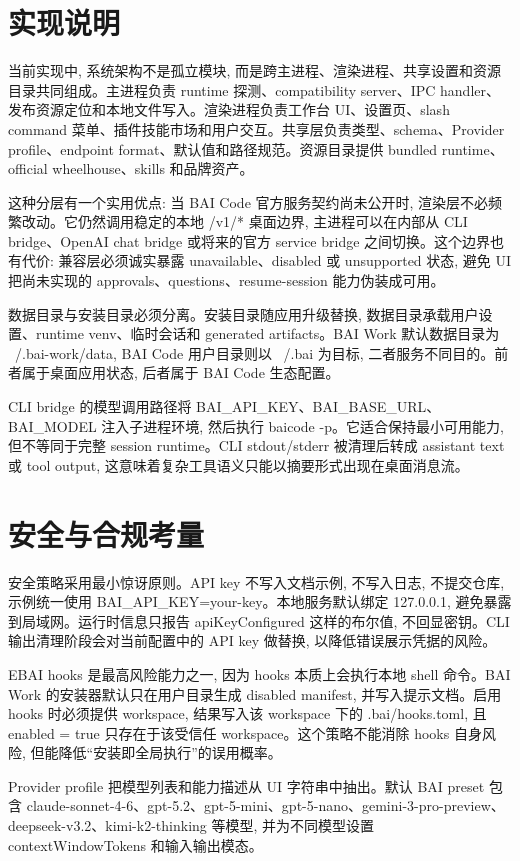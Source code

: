 \section{实现说明}
当前实现中, 系统架构不是孤立模块, 而是跨主进程、渲染进程、共享设置和资源目录共同组成。主进程负责 runtime 探测、compatibility server、IPC handler、发布资源定位和本地文件写入。渲染进程负责工作台 UI、设置页、slash command 菜单、插件技能市场和用户交互。共享层负责类型、schema、Provider profile、endpoint format、默认值和路径规范。资源目录提供 bundled runtime、official wheelhouse、skills 和品牌资产。

这种分层有一个实用优点: 当 BAI Code 官方服务契约尚未公开时, 渲染层不必频繁改动。它仍然调用稳定的本地 /v1/* 桌面边界, 主进程可以在内部从 CLI bridge、OpenAI chat bridge 或将来的官方 service bridge 之间切换。这个边界也有代价: 兼容层必须诚实暴露 unavailable、disabled 或 unsupported 状态, 避免 UI 把尚未实现的 approvals、questions、resume-session 能力伪装成可用。

数据目录与安装目录必须分离。安装目录随应用升级替换, 数据目录承载用户设置、runtime venv、临时会话和 generated artifacts。BAI Work 默认数据目录为 ~/.bai-work/data, BAI Code 用户目录则以 ~/.bai 为目标, 二者服务不同目的。前者属于桌面应用状态, 后者属于 BAI Code 生态配置。

CLI bridge 的模型调用路径将 BAI\_API\_KEY、BAI\_BASE\_URL、BAI\_MODEL 注入子进程环境, 然后执行 baicode -p。它适合保持最小可用能力, 但不等同于完整 session runtime。CLI stdout/stderr 被清理后转成 assistant text 或 tool output, 这意味着复杂工具语义只能以摘要形式出现在桌面消息流。

\section{安全与合规考量}
安全策略采用最小惊讶原则。API key 不写入文档示例, 不写入日志, 不提交仓库, 示例统一使用 BAI\_API\_KEY=your-key。本地服务默认绑定 127.0.0.1, 避免暴露到局域网。运行时信息只报告 apiKeyConfigured 这样的布尔值, 不回显密钥。CLI 输出清理阶段会对当前配置中的 API key 做替换, 以降低错误展示凭据的风险。

EBAI hooks 是最高风险能力之一, 因为 hooks 本质上会执行本地 shell 命令。BAI Work 的安装器默认只在用户目录生成 disabled manifest, 并写入提示文档。启用 hooks 时必须提供 workspace, 结果写入该 workspace 下的 .bai/hooks.toml, 且 enabled = true 只存在于该受信任 workspace。这个策略不能消除 hooks 自身风险, 但能降低“安装即全局执行”的误用概率。

Provider profile 把模型列表和能力描述从 UI 字符串中抽出。默认 BAI preset 包含 claude-sonnet-4-6、gpt-5.2、gpt-5-mini、gpt-5-nano、gemini-3-pro-preview、deepseek-v3.2、kimi-k2-thinking 等模型, 并为不同模型设置 contextWindowTokens 和输入输出模态。

